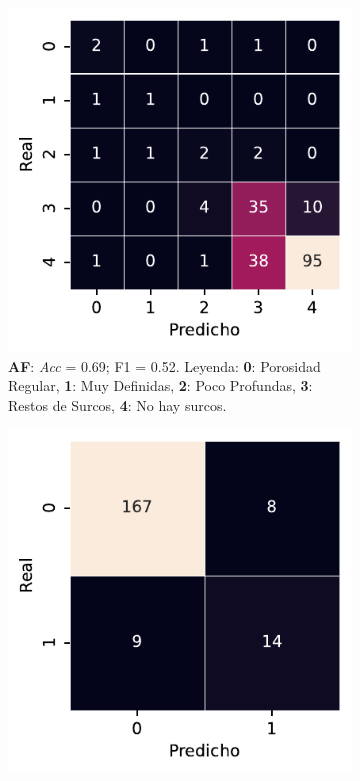 \begin{figure}[htbp]
    \centering
    \begin{subfigure}[t]{0.3\textwidth}
        \includegraphics[width=\textwidth]{figures/5_experiments/multi-af-cm.pdf}
        \caption{\textbf{AF}: \textit{Acc} = 0.69; F1 = 0.52. Leyenda: \textbf{0}: Porosidad Regular, \textbf{1}: Muy Definidas, \textbf{2}: Poco Profundas, \textbf{3}: Restos de Surcos, \textbf{4}: No hay surcos.}
        \label{fig5:AF_confusion_matrix}
    \end{subfigure} 
    \begin{subfigure}[t]{0.3\textwidth}
        \includegraphics[width=\textwidth]{figures/5_experiments/multi-bn-cm.pdf}

\end{subfigure}
\end{figure}
